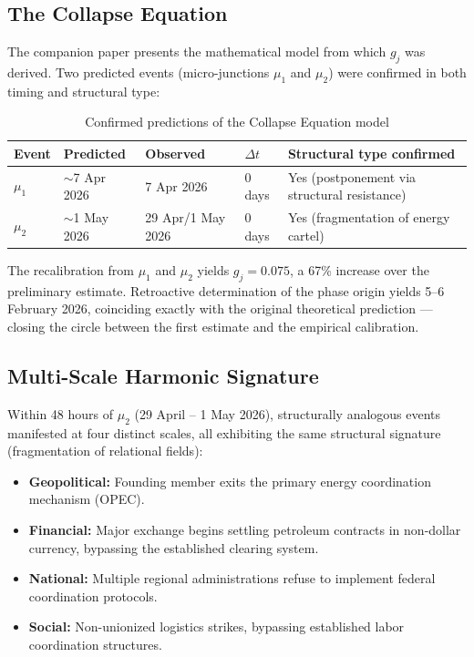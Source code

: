 \documentclass[12pt,a4paper]{article}
\newcommand{\gj}{g_j}
\begin{document}
\subsection{The Collapse Equation}

The companion paper \cite{ghioni2026collapse} presents the mathematical model from which $\gj$ was derived. Two predicted events (micro-junctions $\mu_1$ and $\mu_2$) were confirmed in both timing and structural type:

\begin{table}[H]
\centering
\caption{Confirmed predictions of the Collapse Equation model}
\label{tab:predictions}
\begin{tabularx}{\textwidth}{@{}llllX@{}}
\toprule
\textbf{Event} & \textbf{Predicted} & \textbf{Observed} & $\Delta t$ & \textbf{Structural type confirmed} \\
\midrule
$\mu_1$ & $\sim$7 Apr 2026 & 7 Apr 2026 & 0 days & Yes (postponement via structural resistance) \\
$\mu_2$ & $\sim$1 May 2026 & 29 Apr/1 May 2026 & 0 days & Yes (fragmentation of energy cartel) \\
\bottomrule
\end{tabularx}
\end{table}

The recalibration from $\mu_1$ and $\mu_2$ yields $\gj = 0.075$, a 67\% increase over the preliminary estimate. Retroactive determination of the phase origin yields 5--6 February 2026, coinciding exactly with the original theoretical prediction --- closing the circle between the first estimate and the empirical calibration.

\subsection{Multi-Scale Harmonic Signature}

Within 48 hours of $\mu_2$ (29 April -- 1 May 2026), structurally analogous events manifested at four distinct scales, all exhibiting the same structural signature (fragmentation of relational fields):

\begin{itemize}[leftmargin=2em]
    \item \textbf{Geopolitical:} Founding member exits the primary energy coordination mechanism (OPEC).
    \item \textbf{Financial:} Major exchange begins settling petroleum contracts in non-dollar currency, bypassing the established clearing system.
    \item \textbf{National:} Multiple regional administrations refuse to implement federal coordination protocols.
    \item \textbf{Social:} Non-unionized logistics strikes, bypassing established labor coordination structures.
\end{itemize}
\end{document}
